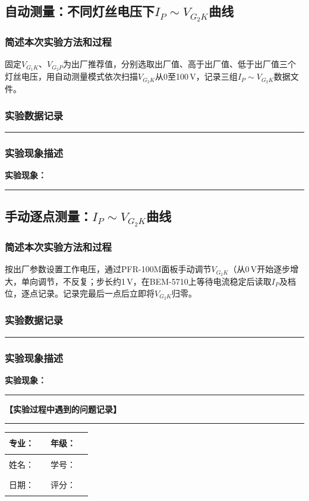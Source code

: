 \documentclass[dvipsnames, svgnames,a4paper,11pt]{article}
\newcommand{\recordblank}[1]{%
  \par\noindent\rule{0.95\linewidth}{0pt}\rule{0pt}{#1}\par}
\begin{document}
\subsection{自动测量：不同灯丝电压下$I_P\sim V_{G_2K}$曲线}
\subsubsection{简述本次实验方法和过程}
固定$V_{G_1K}$、$V_{G_2P}$为出厂推荐值，分别选取出厂值、高于出厂值、低于出厂值三个灯丝电压，用自动测量模式依次扫描$V_{G_2K}$从0至100\,V，记录三组$I_P\sim V_{G_2K}$数据文件。

\subsubsection{实验数据记录}
\recordblank{5.5cm}
\subsubsection{实验现象描述}
\noindent\textbf{实验现象：}\par
\recordblank{4.5cm}
\subsection{手动逐点测量：$I_P\sim V_{G_2K}$曲线}
\subsubsection{简述本次实验方法和过程}
按出厂参数设置工作电压，通过PFR-100M面板手动调节$V_{G_2K}$（从0\,V开始逐步增大，单向调节，不反复；步长约1\,V，在BEM-5710上等待电流稳定后读取$I_P$及档位，逐点记录。记录完最后一点后立即将$V_{G_2K}$归零。

\subsubsection{实验数据记录}
\recordblank{5.5cm}
\subsubsection{实验现象描述}
\noindent\textbf{实验现象：}\par
\recordblank{4.5cm}
\textbf{【实验过程中遇到的问题记录】}
\recordblank{5cm}
\clearpage
\begin{table}
	\renewcommand\arraystretch{1.7}
	\begin{tabularx}{\textwidth}{|X|X|X|X|}
	\hline
	专业：& \rule{2.5cm}{0.4pt} & 年级：& \rule{2.5cm}{0.4pt}\\
	\hline
	姓名：& \rule{2.5cm}{0.4pt} & 学号：& \rule{3cm}{0.4pt}\\
	\hline
	日期：& \rule{3cm}{0.4pt} & 评分：& \rule{3cm}{0.4pt}\\
	\hline
	\end{tabularx}
\end{table}
\end{document}
